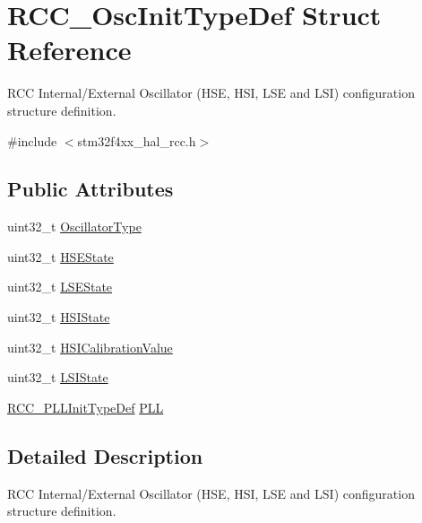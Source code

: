 \hypertarget{struct_r_c_c___osc_init_type_def}{}\section{R\+C\+C\+\_\+\+Osc\+Init\+Type\+Def Struct Reference}
\label{struct_r_c_c___osc_init_type_def}


R\+CC Internal/\+External Oscillator (H\+SE, H\+SI, L\+SE and L\+SI) configuration structure definition.  




{\ttfamily \#include $<$stm32f4xx\+\_\+hal\+\_\+rcc.\+h$>$}

\subsection*{Public Attributes}
\begin{DoxyCompactItemize}
\item 
uint32\+\_\+t \hyperlink{struct_r_c_c___osc_init_type_def_af9e7bc89cab81c1705d94c74c7a81088}{Oscillator\+Type}
\item 
uint32\+\_\+t \hyperlink{struct_r_c_c___osc_init_type_def_a7e05d6eec98ed8cdaba00ca3d167ff72}{H\+S\+E\+State}
\item 
uint32\+\_\+t \hyperlink{struct_r_c_c___osc_init_type_def_a7c1294e9407e69e80fe034caf35fe7ea}{L\+S\+E\+State}
\item 
uint32\+\_\+t \hyperlink{struct_r_c_c___osc_init_type_def_a39b62cae65fe7a251000354e5bba8cb6}{H\+S\+I\+State}
\item 
uint32\+\_\+t \hyperlink{struct_r_c_c___osc_init_type_def_a9b2e48e452d0c334f2b9473216064560}{H\+S\+I\+Calibration\+Value}
\item 
uint32\+\_\+t \hyperlink{struct_r_c_c___osc_init_type_def_a955de90db8882fde02c4fb59c7c000f0}{L\+S\+I\+State}
\item 
\hyperlink{struct_r_c_c___p_l_l_init_type_def}{R\+C\+C\+\_\+\+P\+L\+L\+Init\+Type\+Def} \hyperlink{struct_r_c_c___osc_init_type_def_af76de5ee86798f0c3a4c83c84dfa58be}{P\+LL}
\end{DoxyCompactItemize}


\subsection{Detailed Description}
R\+CC Internal/\+External Oscillator (H\+SE, H\+SI, L\+SE and L\+SI) configuration structure definition. 

